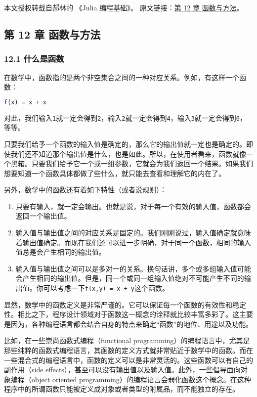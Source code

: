 
本文授权转载自郝林的 《Julia 编程基础》。 原文链接：\href{https://github.com/hyper0x/JuliaBasics/blob/master/book/ch11.md}{第 12 章 函数与方法}。

\subsection{第 12 章 函数与方法}

\subsubsection{12.1 什么是函数}

在数学中，函数指的是两个非空集合之间的一种对应关系。例如，有这样一个函数：

\begin{lstlisting}[language=julia]
f(x) = x + x
\end{lstlisting}

对此，我们输入\verb|1|就一定会得到\verb|2|，输入\verb|2|就一定会得到\verb|4|，输入\verb|3|就一定会得到\verb|6|，等等。

只要我们给予一个函数的输入值是确定的，那么它的输出值就一定也是确定的。即使我们还不知道那个输出值是什么，也是如此。所以，在使用者看来，函数就像一个黑箱。只要我们给予它一个或一组参数，它就会为我们返回一个结果。如果我们想要知道一个函数具体都做了些什么，就只能去查看和理解它的内在了。

另外，数学中的函数还有着如下特性（或者说规则）：

\begin{enumerate}
\item 只要有输入，就一定会输出。也就是说，对于每一个有效的输入值，函数都会返回一个输出值。
\item 输入值与输出值之间的对应关系是固定的。我们刚刚说过，输入值确定就意味着输出值确定。而现在我们还可以进一步明确，对于同一个函数，相同的输入值总是会产生相同的输出值。
\item 输入值与输出值之间可以是多对一的关系。换句话讲，多个或多组输入值可能会产生相同的输出值。但是，同一个或同一组输入值绝对不可能产生不同的输出值。你可以考虑一下\verb|f(x,y) = x + y|这个函数。
\end{enumerate}

显然，数学中的函数定义是非常严谨的。它可以保证每一个函数的有效性和稳定性。相比之下，程序设计领域对于函数这一概念的诠释就比较丰富多彩了。这主要是因为，各种编程语言都会结合自身的特点来确定“函数”的地位、用途以及功能。

比如，在一些崇尚函数式编程（functional programming）的编程语言中，尤其是那些纯粹的函数式编程语言，其函数的定义方式就非常贴近于数学中的函数。而在一些混合式的编程语言中，函数的定义可以是非常灵活的。这些函数可以有自己的副作用（side effects），甚至可以没有输出值以及输入值。此外，一些倡导面向对象编程（object oriented programming）的编程语言会弱化函数这个概念。在这种程序中的所谓函数只能被定义成对象或者类型的附属品，而不能独立的存在。

